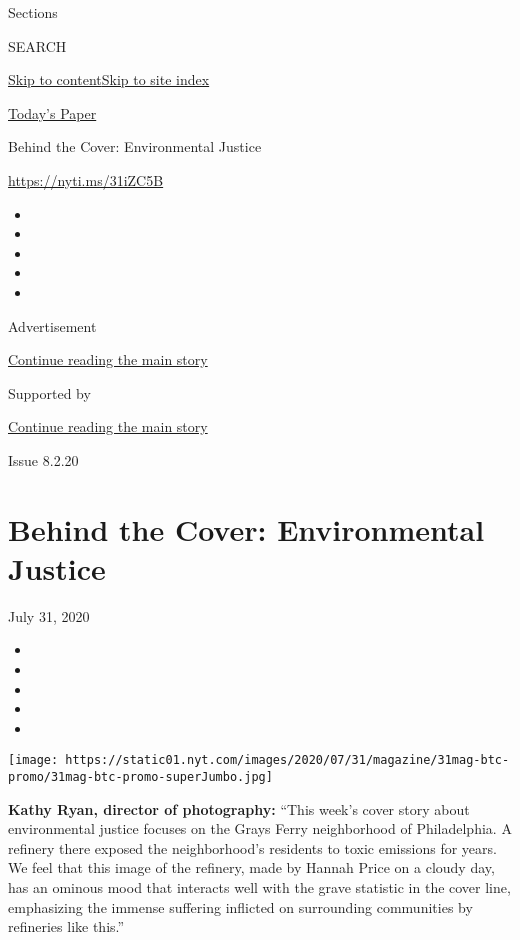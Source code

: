 Sections

SEARCH

\protect\hyperlink{site-content}{Skip to
content}\protect\hyperlink{site-index}{Skip to site index}

\href{https://myaccount.nytimes.com/auth/login?response_type=cookie\&client_id=vi}{}

\href{https://www.nytimes.com/section/todayspaper}{Today's Paper}

Behind the Cover: Environmental Justice

\href{https://nyti.ms/31iZC5B}{https://nyti.ms/31iZC5B}

\begin{itemize}
\item
\item
\item
\item
\item
\end{itemize}

Advertisement

\protect\hyperlink{after-top}{Continue reading the main story}

Supported by

\protect\hyperlink{after-sponsor}{Continue reading the main story}

Issue 8.2.20

\hypertarget{behind-the-cover-environmental-justice}{%
\section{Behind the Cover: Environmental
Justice}\label{behind-the-cover-environmental-justice}}

July 31, 2020

\begin{itemize}
\item
\item
\item
\item
\item
\end{itemize}

\texttt{[image: https://static01.nyt.com/images/2020/07/31/magazine/31mag-btc-promo/31mag-btc-promo-superJumbo.jpg]}

\textbf{Kathy Ryan, director of photography:} ``This week's cover story
about environmental justice focuses on the Grays Ferry neighborhood of
Philadelphia. A refinery there exposed the neighborhood's residents to
toxic emissions for years. We feel that this image of the refinery, made
by Hannah Price on a cloudy day, has an ominous mood that interacts well
with the grave statistic in the cover line, emphasizing the immense
suffering inflicted on surrounding communities by refineries like
this.''

